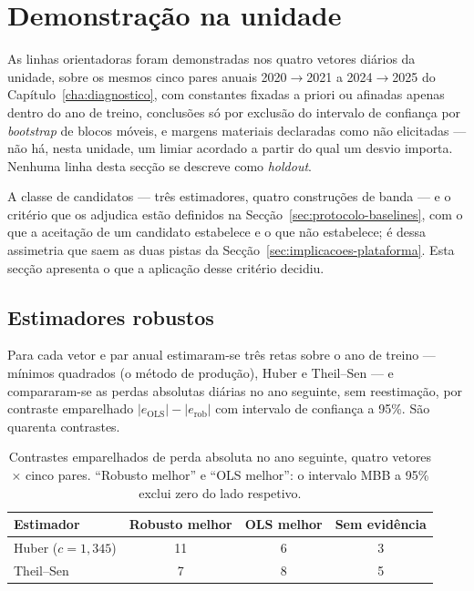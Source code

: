 \section{Demonstração na unidade}
\label{sec:demonstracao}

As linhas orientadoras foram demonstradas nos quatro vetores diários da
unidade, sobre os mesmos cinco pares anuais 2020${\to}$2021 a
2024${\to}$2025 do Capítulo~\ref{cha:diagnostico}, com constantes fixadas a
priori ou afinadas apenas dentro do ano de treino, conclusões só por
exclusão do intervalo de confiança por \emph{bootstrap} de blocos móveis, e
margens materiais declaradas como não elicitadas --- não há, nesta unidade,
um limiar acordado a partir do qual um desvio importa. Nenhuma linha desta
secção se descreve como \emph{holdout}.

A classe de candidatos --- três estimadores, quatro construções de banda ---
e o critério que os adjudica estão definidos na
Secção~\ref{sec:protocolo-baselines}, com o que a aceitação de um candidato
estabelece e o que não estabelece; é dessa assimetria que saem as duas pistas
da Secção~\ref{sec:implicacoes-plataforma}. Esta secção apresenta o que a
aplicação desse critério decidiu.

\subsection{Estimadores robustos}
\label{sec:demo-robustos}

Para cada vetor e par anual estimaram-se três retas sobre o ano de treino
--- mínimos quadrados (o método de produção), Huber e Theil--Sen --- e
compararam-se as perdas absolutas diárias no ano seguinte, sem reestimação,
por contraste emparelhado $|e_{\mathrm{OLS}}| - |e_{\mathrm{rob}}|$ com
intervalo de confiança a 95\%. São quarenta contrastes.

\begin{table}[htbp]
  \centering
  \caption[Estimadores robustos contra mínimos quadrados]{Contrastes
  emparelhados de perda absoluta no ano seguinte, quatro vetores $\times$
  cinco pares. ``Robusto melhor'' e ``OLS melhor'': o intervalo MBB a 95\%
  exclui zero do lado respetivo.}
  \label{tab:robustos}
  \begin{tabular}{lccc}
    \toprule
    Estimador & Robusto melhor & OLS melhor & Sem evidência \\
    \midrule
    Huber ($c = 1{,}345$) & 11 & 6 & 3 \\
    Theil--Sen            & 7  & 8 & 5 \\
    \bottomrule
  \end{tabular}
\end{table}


